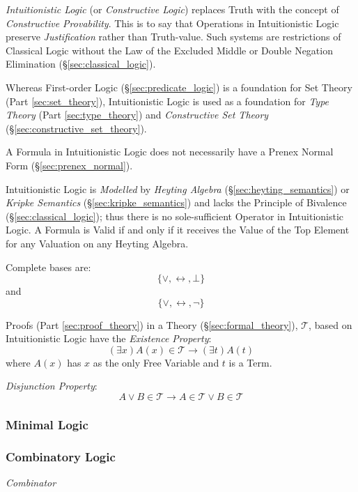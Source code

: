 \emph{Intuitionistic Logic} (or \emph{Constructive Logic}) replaces
Truth with the concept of \emph{Constructive Provability}. This is to
say that Operations in Intuitionistic Logic preserve
\emph{Justification} rather than Truth-value. Such systems are
restrictions of Classical Logic without the Law of the Excluded Middle
or Double Negation Elimination (\S\ref{sec:classical_logic}).

Whereas First-order Logic (\S\ref{sec:predicate_logic}) is a
foundation for Set Theory (Part \ref{sec:set_theory}), Intuitionistic
Logic is used as a foundation for \emph{Type Theory} (Part
\ref{sec:type_theory}) and \emph{Constructive Set Theory}
(\S\ref{sec:constructive_set_theory}).

A Formula in Intuitionistic Logic does not necessarily have a Prenex
Normal Form (\S\ref{sec:prenex_normal}).

Intuitionistic Logic is \emph{Modelled} by \emph{Heyting Algebra}
(\S\ref{sec:heyting_semantics}) or \emph{Kripke Semantics}
(\S\ref{sec:kripke_semantics}) and lacks the Principle of Bivalence
(\S\ref{sec:classical_logic}); thus there is no sole-sufficient
Operator in Intuitionistic Logic. A Formula is Valid if and only if it
receives the Value of the Top Element for any Valuation on any Heyting
Algebra.

Complete bases are:
\[
    \{ \vee, \leftrightarrow, \bot \}
\]
and
\[
    \{ \vee, \leftrightarrow, \neg \}
\]

Proofs (Part \ref{sec:proof_theory}) in a Theory
(\S\ref{sec:formal_theory}), $\mathcal{T}$, based on Intuitionistic
Logic have the \emph{Existence Property}:
\[
    (\exists x)A(x) \in \mathcal{T} \rightarrow (\exists t)A(t)
\]
where $A(x)$ has $x$ as the only Free Variable and $t$ is a Term.

\emph{Disjunction Property}:
\[
    A \vee B \in \mathcal{T} \rightarrow A \in \mathcal{T} \vee B \in \mathcal{T}
\]

\subsubsection{Minimal Logic}



\subsubsection{Combinatory Logic}\label{sec:combinatory_logic}

\emph{Combinator}



